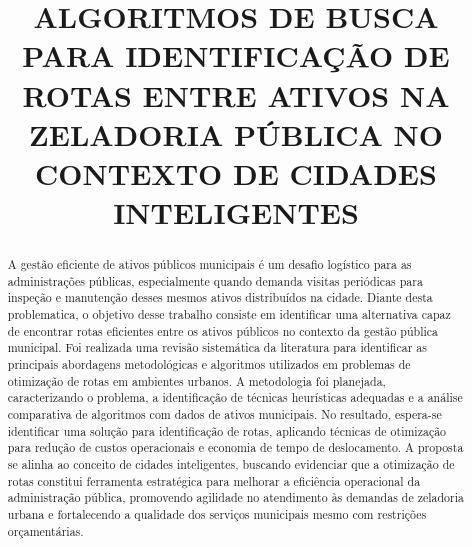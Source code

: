 \documentclass[conference,12pt]{IEEEtran}
\begin{document}
\title{\small\bfseries ALGORITMOS DE BUSCA PARA IDENTIFICAÇÃO DE ROTAS ENTRE ATIVOS NA ZELADORIA PÚBLICA NO CONTEXTO DE CIDADES INTELIGENTES}

\author{
    \vspace{-4cm} %
}

\maketitle

\begin{abstract}
    A gestão eficiente de ativos públicos municipais é um desafio logístico para as administrações
    públicas, especialmente quando demanda visitas periódicas para inspeção e manutenção
    desses mesmos ativos distribuídos na cidade. Diante desta problematica,
    o objetivo desse trabalho consiste em identificar uma alternativa capaz de encontrar rotas
    eficientes entre os ativos públicos no contexto da
    gestão pública municipal. Foi realizada uma revisão sistemática da literatura para identificar
    as principais abordagens metodológicas e algoritmos utilizados em problemas de otimização
    de rotas em ambientes urbanos. A metodologia foi planejada, caracterizando o problema, a
    identificação de técnicas heurísticas adequadas e a análise comparativa de algoritmos com
    dados de ativos municipais. No resultado, espera-se identificar uma solução
    para identificação de rotas, aplicando
    técnicas de otimização para redução de custos operacionais e
    economia de tempo de deslocamento.
    A proposta se alinha ao conceito de cidades inteligentes,
    buscando evidenciar que a otimização de rotas constitui ferramenta estratégica
    para melhorar a eficiência operacional da administração pública,
    promovendo agilidade no atendimento às demandas de zeladoria urbana e
    fortalecendo a qualidade dos serviços municipais mesmo com restrições orçamentárias.
\end{abstract}
\end{document}
